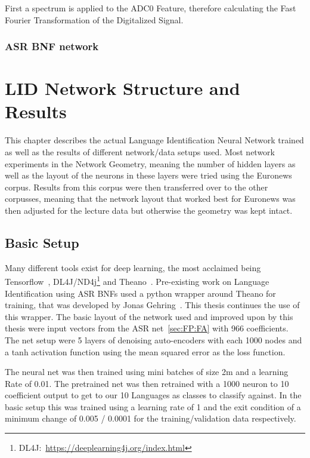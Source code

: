 First a spectrum is applied to the ADC0 Feature, therefore calculating the Fast Fourier Transformation of the Digitalized Signal.

\subsection{ASR BNF network}
\label{sec:FP:Net}


\chapter{LID Network Structure and Results}
\label{ch:LIDNetwork}

This chapter describes the actual Language Identification Neural Network trained as well as the results of different network/data setups used. Most network experiments in the Network Geometry, meaning the number of hidden layers as well as the layout of the neurons in these layers were tried using the Euronews corpus. Results from this corpus were then transferred over to the other corpusses, meaning that the network layout that worked best for Euronews was then adjusted for the lecture data but otherwise the geometry was kept intact.

\section{Basic Setup}
\label{sec:LIDNetwork:Basic}

Many different tools exist for deep learning, the most acclaimed being Tensorflow~\cite{DBLP:journals/corr/AbadiABBCCCDDDG16}, DL4J/ND4j\footnote{DL4J:~\url{https://deeplearning4j.org/index.html}} and Theano~\cite{bergstra2011theano}. Pre-existing work on Language Identification using ASR BNFs used a python wrapper around Theano for training, that was developed by Jonas Gehring~\cite{gehringMA}. This thesis continues the use of this wrapper. The basic layout of the network used and improved upon by this thesis were input vectors from the ASR net~\ref{sec:FP:FA} with 966 coefficients. The net setup were 5 layers of denoising auto-encoders with each 1000 nodes and a tanh activation function using the mean squared error as the loss function. 

The neural net was then trained using mini batches of size 2m and a learning Rate of 0.01. The pretrained net was then retrained with a 1000 neuron to 10 coefficient output to get to our 10 Languages as classes to classify against. In the basic setup this was trained using a learning rate of 1 and the exit condition of a minimum change of 0.005 / 0.0001 for the training/validation data respectively.


